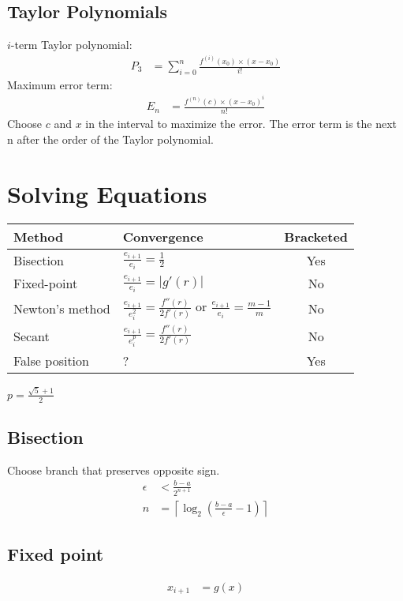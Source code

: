 \documentclass[12pt]{article}
\newcommand{\round}   [1]{\left(       #1 \right)}
\newcommand{\straight}[1]{\left|       #1 \right|}
\newcommand{\ceiling} [1]{\left\lceil  #1 \right\rceil}
\begin{document}
\subsection*{Taylor Polynomials}
$i$-term Taylor polynomial:
\begin{align*}
    P_3 &= \sum_{i=0}^n \frac{f^{(i)}(x_0) \times (x - x_0)}{i!}
\end{align*}
Maximum error term:
\begin{align*}
    E_n &= \frac{f^{(n)}(c) \times (x - x_0)^i}{n!}
\end{align*}
Choose $c$ and $x$ in the interval to maximize the error. The error term is the next n after the order of the Taylor polynomial.

\section*{Solving Equations}

\begin{center}
    \begin{tabular}{l|lc}
        Method & Convergence & Bracketed \\ \hline
        Bisection & $\frac{e_{i+1}}{e_i} = \frac{1}{2}$ & Yes \\
        Fixed-point & $\frac{e_{i+1}}{e_i} = \straight{g'(r)}$ & No \\
        Newton's method & $\frac{e_{i+1}}{e_i^2} = \frac{f''(r)}{2f'(r)}$ or $\frac{e_{i+1}}{e_i} = \frac{m - 1}{m}$ & No \\
        Secant & $\frac{e_{i+1}}{e_i^p} = \frac{f''(r)}{2f'(r)}$ & No \\
        False position & ? & Yes
    \end{tabular}
\end{center}

$p = \frac{\sqrt{5} + 1}{2}$

\subsection*{Bisection}
Choose branch that preserves opposite sign.
\begin{align*}
    \epsilon &< \frac{b - a}{2^{n + 1}} \\
    n &= \ceiling{\log_2 \round{\frac{b - a}{\epsilon} - 1}}
\end{align*}

\subsection*{Fixed point}
\begin{align*}
    x_{i + 1} &= g(x)
\end{align*}
\end{document}
